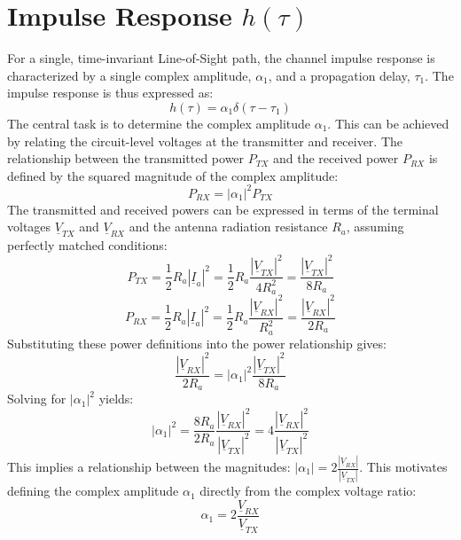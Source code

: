 \section{Impulse Response $h(\tau)$}
For a single, time-invariant Line-of-Sight path, the channel impulse response is characterized by a single complex amplitude, $\alpha_1$, and a propagation delay, $\tau_1$. The impulse response is thus expressed as:
\begin{equation}
	h(\tau) = \alpha_1 \delta(\tau - \tau_1)
\end{equation}
The central task is to determine the complex amplitude $\alpha_1$. This can be achieved by relating the circuit-level voltages at the transmitter and receiver. The relationship between the transmitted power $P_{TX}$ and the received power $P_{RX}$ is defined by the squared magnitude of the complex amplitude:
\begin{equation}
	P_{RX} = |\alpha_1|^2 P_{TX}
\end{equation}
The transmitted and received powers can be expressed in terms of the terminal voltages $\underline{V}_{TX}$ and $\underline{V}_{RX}$ and the antenna radiation resistance $R_a$, assuming perfectly matched conditions:
\begin{equation}
	P_{TX} = \frac{1}{2} R_a |\underline{I}_a|^2 = \frac{1}{2} R_a \frac{|\underline{V}_{TX}|^2}{4R_a^2} = \frac{|\underline{V}_{TX}|^2}{8R_a} 
\end{equation}
\begin{equation}
	P_{RX} = \frac{1}{2} R_a |\underline{I}_a|^2 = \frac{1}{2} R_a \frac{|\underline{V}_{RX}|^2}{R_a^2}= \frac{|\underline{V}_{RX}|^2}{2R_a}
\end{equation}
Substituting these power definitions into the power relationship gives:
\begin{equation}
	\frac{|\underline{V}_{RX}|^2}{2R_a} = |\alpha_1|^2 \frac{|\underline{V}_{TX}|^2}{8R_a}
\end{equation}
Solving for $|\alpha_1|^2$ yields:
\begin{equation}
	|\alpha_1|^2 = \frac{8R_a}{2R_a} \frac{|\underline{V}_{RX}|^2}{|\underline{V}_{TX}|^2} = 4 \frac{|\underline{V}_{RX}|^2}{|\underline{V}_{TX}|^2}
\end{equation}
This implies a relationship between the magnitudes: $|\alpha_1| = 2 \frac{|\underline{V}_{RX}|}{|\underline{V}_{TX}|}$. This motivates defining the complex amplitude $\alpha_1$ directly from the complex voltage ratio:
\begin{equation}
	\alpha_1 = 2 \frac{\underline{V}_{RX}}{\underline{V}_{TX}}
	\label{eq:alpha_from_voltages}
\end{equation}
